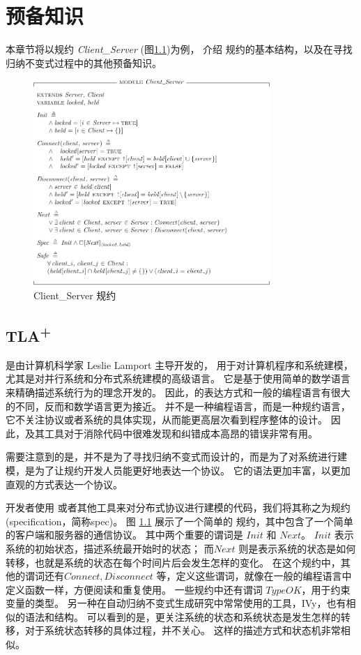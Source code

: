 \chapter{预备知识}

本章节将以规约 \textit{Client\_Server} (图\ref{fig:client_server})为例，
介绍 \TLA 规约的基本结构，以及在寻找归纳不变式过程中的其他预备知识。
\begin{figure}
    \centering
    \includegraphics[width=0.8\textwidth]{figures/Client_Server.pdf}
    \caption{Client\_Server 规约}
    \label{fig:client_server}
\end{figure}

\section{\texorpdfstring{TLA\textsuperscript{+}}{TLA+}}
\href{https://lamport.azurewebsites.net/tla/tla.html}{\TLA} \cite{TLA}是由计算机科学家 Leslie Lamport 主导开发的，
用于对计算机程序和系统建模，尤其是对并行系统和分布式系统建模的高级语言。
它是基于使用简单的数学语言来精确描述系统行为的理念开发的。
因此，\TLA 的表达方式和一般的编程语言有很大的不同，反而和数学语言更为接近。
\TLA 并不是一种编程语言，而是一种规约语言，它不关注协议或者系统的具体实现，从而能更高层次看到程序整体的设计。
因此，\TLA 及其工具对于消除代码中很难发现和纠错成本高昂的错误非常有用。

需要注意到的是，\TLA 并不是为了寻找归纳不变式而设计的，而是为了对系统进行建模，是为了让规约开发人员能更好地表达一个协议。
它的语法更加丰富，以更加直观的方式表达一个协议。

开发者使用 \TLA 或者其他工具来对分布式协议进行建模的代码，我们将其称之为规约(specification，简称spec)。
图 \ref{fig:client_server} 展示了一个简单的 \TLA 规约，其中包含了一个简单的客户端和服务器的通信协议。
其中两个重要的谓词是 $Init$ 和 $Next$。
$Init$ 表示系统的初始状态，描述系统最开始时的状态；
而$Next$ 则是表示系统的状态是如何转移，也就是系统的状态在每个时间片后会发生怎样的变化。
在这个规约中，其他的谓词还有$Connect, Disconnect$ 等，定义这些谓词，就像在一般的编程语言中定义函数一样，方便阅读和重复使用。
一些规约中还有谓词 $TypeOK$，用于约束变量的类型。
另一种在自动归纳不变式生成研究中常常使用的工具，IVy，也有相似的语法和结构。
可以看到的是，\TLA 更关注系统的状态和系统状态是发生怎样的转移，对于系统状态转移的具体过程，\TLA 并不关心。
这样的描述方式和状态机非常相似。

